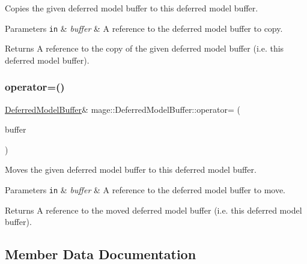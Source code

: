 Copies the given deferred model buffer to this deferred model buffer.


\begin{DoxyParams}[1]{Parameters}
\mbox{\tt in}  & {\em buffer} & A reference to the deferred model buffer to copy. \\
\hline
\end{DoxyParams}
\begin{DoxyReturn}{Returns}
A reference to the copy of the given deferred model buffer (i.\+e. this deferred model buffer). 
\end{DoxyReturn}
\hypertarget{structmage_1_1_deferred_model_buffer_aa5bc6dff6a80b1f1ea8b5d8d5db1ef75}{}\label{structmage_1_1_deferred_model_buffer_aa5bc6dff6a80b1f1ea8b5d8d5db1ef75} 
\subsubsection{\texorpdfstring{operator=()}{operator=()}\hspace{0.1cm}{\footnotesize\ttfamily [2/2]}}
{\footnotesize\ttfamily \hyperlink{structmage_1_1_deferred_model_buffer}{Deferred\+Model\+Buffer}\& mage\+::\+Deferred\+Model\+Buffer\+::operator= (\begin{DoxyParamCaption}\item[{\hyperlink{structmage_1_1_deferred_model_buffer}{Deferred\+Model\+Buffer} \&\&}]{buffer }\end{DoxyParamCaption})\hspace{0.3cm}{\ttfamily [default]}}

Moves the given deferred model buffer to this deferred model buffer.


\begin{DoxyParams}[1]{Parameters}
\mbox{\tt in}  & {\em buffer} & A reference to the deferred model buffer to move. \\
\hline
\end{DoxyParams}
\begin{DoxyReturn}{Returns}
A reference to the moved deferred model buffer (i.\+e. this deferred model buffer). 
\end{DoxyReturn}


\subsection{Member Data Documentation}
\hypertarget{structmage_1_1_deferred_model_buffer_aea013f9eb8c80ef6e3f83702286a12fa}{}\label{structmage_1_1_deferred_model_buffer_aea013f9eb8c80ef6e3f83702286a12fa} 
